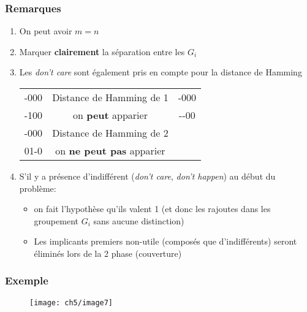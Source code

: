 \subsubsection{Remarques}
\begin{enumerate}
	\item On peut avoir $m=n$
	\item Marquer \textbf{clairement} la séparation entre les $G_i$
	\item Les \textit{don't care} sont également pris en compte pour la distance de Hamming
	\begin{table}[H]
		\centering
		\begin{tabular}{|ccc|}
			\hline
			-000 & Distance de Hamming de 1 & -000\\
			-100 & on \textbf{peut} apparier & -{}-00\\
			\hline
			-000 & Distance de Hamming de 2 & \\
			01-0 & on \textbf{ne peut pas} apparier & \\
			\hline
		\end{tabular}
	\end{table}
	\item S'il y a présence d'indifférent (\textit{don't care}, \textit{don't happen}) au début du problème:
	\begin{itemize}
		\item on fait l'hypothèse qu'ils valent 1 (et donc les rajoutes dans les groupement $G_i$ sans aucune distinction)
		\item Les implicants premiers non-utile (composés que d'indifférents) seront éliminés lors de la 2 phase (couverture)
	\end{itemize}
\end{enumerate}
\subsubsection{Exemple}
\begin{figure}[H]
	\centering
	\texttt{[image: ch5/image7]}
\end{figure}